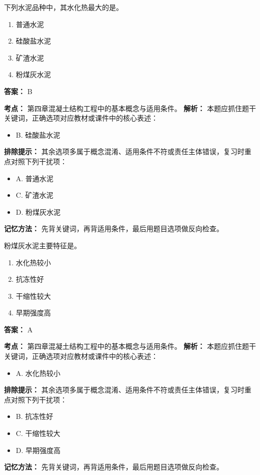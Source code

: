 \documentclass[UTF8,fontset=fandol,11pt]{ctexart}
\begin{document}
\begin{quizbox}[title={第 46 题}]
下列水泥品种中，其水化热最大的是。\\
\begin{enumerate}[label=\Alph*.]
\item 普通水泥
\item 硅酸盐水泥
\item 矿渣水泥
\item 粉煤灰水泥
\end{enumerate}
\textbf{答案：} B
\vspace{0.25em}
\begin{answerbox}[title={考点解析}]
\textbf{考点：} 第四章混凝土结构工程中的基本概念与适用条件。
\textbf{解析：} 本题应抓住题干关键词，正确选项对应教材或课件中的核心表述：
\begin{itemize}
\item B. 硅酸盐水泥
\end{itemize}
\textbf{排除提示：} 其余选项多属于概念混淆、适用条件不符或责任主体错误，复习时重点对照下列干扰项：
\begin{itemize}
\item A. 普通水泥
\item C. 矿渣水泥
\item D. 粉煤灰水泥
\end{itemize}
\textbf{记忆方法：} 先背关键词，再背适用条件，最后用题目选项做反向检查。
\end{answerbox}
\end{quizbox}

\begin{quizbox}[title={第 47 题}]
粉煤灰水泥主要特征是。\\
\begin{enumerate}[label=\Alph*.]
\item 水化热较小
\item 抗冻性好
\item 干缩性较大
\item 早期强度高
\end{enumerate}
\textbf{答案：} A
\vspace{0.25em}
\begin{answerbox}[title={考点解析}]
\textbf{考点：} 第四章混凝土结构工程中的基本概念与适用条件。
\textbf{解析：} 本题应抓住题干关键词，正确选项对应教材或课件中的核心表述：
\begin{itemize}
\item A. 水化热较小
\end{itemize}
\textbf{排除提示：} 其余选项多属于概念混淆、适用条件不符或责任主体错误，复习时重点对照下列干扰项：
\begin{itemize}
\item B. 抗冻性好
\item C. 干缩性较大
\item D. 早期强度高
\end{itemize}
\textbf{记忆方法：} 先背关键词，再背适用条件，最后用题目选项做反向检查。
\end{answerbox}
\end{quizbox}
\end{document}
